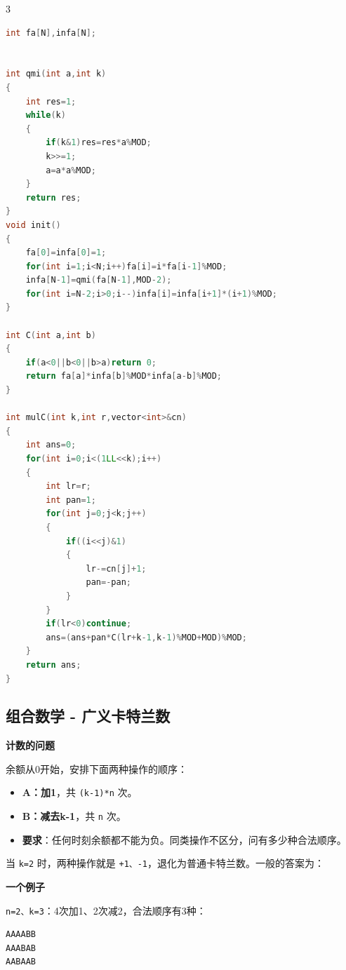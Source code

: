 \documentclass[10pt,landscape,a4paper]{article}
\newcommand{\NotebookMath}[1]{%
  \par\begingroup
  \sbox{\NotebookMathBox}{$\displaystyle #1$}%
  \noindent\makebox[\linewidth][c]{%
    \ifdim\wd\NotebookMathBox>\linewidth
      \resizebox{\linewidth}{!}{\usebox{\NotebookMathBox}}%
    \else\usebox{\NotebookMathBox}\fi}%
  \par\endgroup}
\begin{document}
\begin{multicols*}{3}
\begin{lstlisting}[language=C++]
int fa[N],infa[N];


int qmi(int a,int k)
{
    int res=1;
    while(k)
    {
        if(k&1)res=res*a%MOD;
        k>>=1;
        a=a*a%MOD;
    }
    return res;
}
void init()
{
    fa[0]=infa[0]=1;
    for(int i=1;i<N;i++)fa[i]=i*fa[i-1]%MOD;
    infa[N-1]=qmi(fa[N-1],MOD-2);
    for(int i=N-2;i>0;i--)infa[i]=infa[i+1]*(i+1)%MOD;
}

int C(int a,int b)
{
    if(a<0||b<0||b>a)return 0;
    return fa[a]*infa[b]%MOD*infa[a-b]%MOD; 
}

int mulC(int k,int r,vector<int>&cn)
{
    int ans=0;
    for(int i=0;i<(1LL<<k);i++)
    {
        int lr=r;
        int pan=1;
        for(int j=0;j<k;j++)
        {
            if((i<<j)&1)
            {
                lr-=cn[j]+1;
                pan=-pan;
            }
        }
        if(lr<0)continue;
        ans=(ans+pan*C(lr+k-1,k-1)%MOD+MOD)%MOD;
    }
    return ans;
}
\end{lstlisting}
\subsection*{组合数学 - 广义卡特兰数}
\par\addvspace{0.7ex}\noindent\textbf{计数的问题}\par\nobreak
余额从0开始，安排下面两种操作的顺序：\par
\begin{itemize}
\item \textbf{A：加1}，共 \texttt{(\allowbreak{}k\allowbreak{}-\allowbreak{}1\allowbreak{})\allowbreak{}*\allowbreak{}n} 次。
\item \textbf{B：减去k-1}，共 \texttt{n} 次。
\item \textbf{要求}：任何时刻余额都不能为负。同类操作不区分，问有多少种合法顺序。
\end{itemize}
当 \texttt{k\allowbreak{}=\allowbreak{}2} 时，两种操作就是 \texttt{+\allowbreak{}1\allowbreak{}、\allowbreak{}-\allowbreak{}1}，退化为普通卡特兰数。一般的答案为：\par
\NotebookMath{F_k(n)=\frac{1}{(k-1)n+1}\binom{kn}{n}}
\par\addvspace{0.7ex}\noindent\textbf{一个例子}\par\nobreak
\texttt{n\allowbreak{}=\allowbreak{}2\allowbreak{}、\allowbreak{}k\allowbreak{}=\allowbreak{}3}：4次加1、2次减2，合法顺序有3种：\par
\begin{lstlisting}[language={},numbers=none,basicstyle=\footnotesize\ttfamily]
AAAABB
AAABAB
AABAAB
\end{lstlisting}


\end{multicols*}
\end{document}
